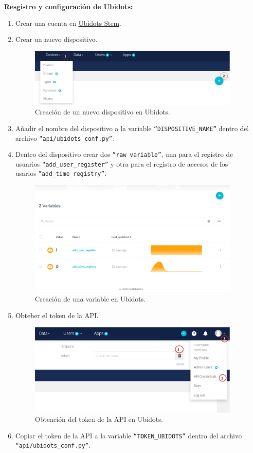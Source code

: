 \documentclass{article}
\begin{document}
\textbf{Resgistro y configuración de Ubidots:}
\begin{enumerate}
	\item Crear una cuenta en \href{https://stem.ubidots.com/}{Ubidots Stem}.
	\item Crear un nuevo dispositivo.
	\begin{figure}[H]
		\centering
		\includegraphics[width=0.7\linewidth]{../images/ubidots_create_device_1.png}
		\caption{\label{fig:ubidots_create_device_1}Creación de un nuevo dispositivo en Ubidots.}
	\end{figure}
	\item Añadir el nombre del dispositivo a la variable  \texttt{``DISPOSITIVE\_NAME''} dentro del archivo \texttt{``api/ubidots\_conf.py''}.
	\item Dentro del dispositivo crear dos \texttt{``raw variable''}, una para el registro de usuarios \texttt{``add\_user\_register''} y otra para el registro de accesos de los usarios \texttt{``add\_time\_registry''}.
	\begin{figure}[H]
		\centering
		\includegraphics[width=0.7\linewidth]{../images/ubidots_create_variable.png}
		\caption{\label{fig:ubidots_create_variable_1}Creación de una variable en Ubidots.}
	\end{figure}
	\item Obteber el token de la API.
		\begin{figure}[H]
			\centering
			\includegraphics[width=0.7\linewidth]{../images/ubidots_obtener_token.png}
			\caption{\label{fig:ubidots_obtener_token}Obtención del token de la API en Ubidots.}
		\end{figure}
	\item Copiar el token de la API a la variable \texttt{``TOKEN\_UBIDOTS''} dentro del archivo \texttt{``api/ubidots\_conf.py''}.
\end{enumerate}
\end{document}
